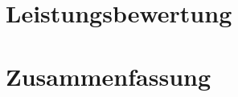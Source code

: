 \documentclass[a4paper,11pt,abstracton,twoside,titlepage,openany,nochapterprefix,noappendixprefix,liststotoc,bibtotoc,normalheadings,pointlessnumbers,BCOR1cm]{article}
\begin{document}
\section{Leistungsbewertung}\label{sec:leist}

\newpage

\section{Zusammenfassung}

\newpage

\newpage
\pagestyle{empty}


\newpage

\lstlistoflistings
\mbox{}
\cleardoublepage
\end{document}
